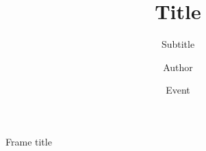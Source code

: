 \documentclass{beamer}
\title{Title}
\subtitle{Subtitle}
\author{Author}
\institute{Institute}
\date{Event}
\begin{document}
\frame{\titlepage}

\begin{frame}{Frame title}
\blindtext
\end{frame}
\end{document}
